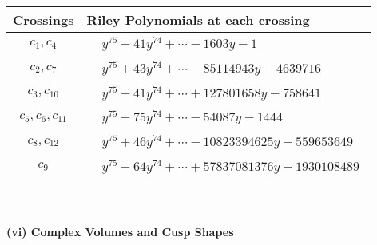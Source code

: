 \documentclass[1p]{elsarticle_modified}
\theoremstyle{definition}
\begin{document}
\begin{tabular}{m{50pt}|m{274pt}}
Crossings & \hspace{64pt}Riley Polynomials at each crossing \\
\hline $$\begin{aligned}c_{1},c_{4}\end{aligned}$$&$\begin{aligned}
&y^{75}-41 y^{74}+\cdots-1603 y-1
\end{aligned}$\\
\hline $$\begin{aligned}c_{2},c_{7}\end{aligned}$$&$\begin{aligned}
&y^{75}+43 y^{74}+\cdots-85114943 y-4639716
\end{aligned}$\\
\hline $$\begin{aligned}c_{3},c_{10}\end{aligned}$$&$\begin{aligned}
&y^{75}-41 y^{74}+\cdots+127801658 y-758641
\end{aligned}$\\
\hline $$\begin{aligned}c_{5},c_{6},c_{11}\end{aligned}$$&$\begin{aligned}
&y^{75}-75 y^{74}+\cdots-54087 y-1444
\end{aligned}$\\
\hline $$\begin{aligned}c_{8},c_{12}\end{aligned}$$&$\begin{aligned}
&y^{75}+46 y^{74}+\cdots-10823394625 y-559653649
\end{aligned}$\\
\hline $$\begin{aligned}c_{9}\end{aligned}$$&$\begin{aligned}
&y^{75}-64 y^{74}+\cdots+57837081376 y-1930108489
\end{aligned}$\\
\hline
\end{tabular}\\~\\
\newpage\flushleft \textbf{(vi) Complex Volumes and Cusp Shapes}
\end{document}

